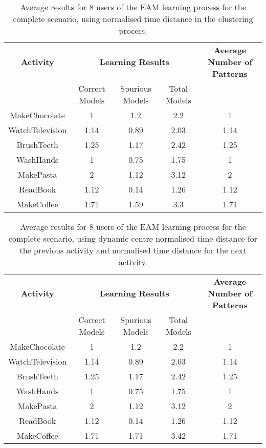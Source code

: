\begin{table}[htbp]\scriptsize
  \begin{center}
        \begin{tabular}{ccccc}
            \hline            
            \textbf{Activity} & \multicolumn{3}{c}{\textbf{Learning Results}} & \textbf{Average Number of Patterns} \\
             & Correct Models & Spurious Models & Total Models & \\
            \hline
            MakeChocolate   & 1    & 1.2   & 2.2  & 1 \\
	    WatchTelevision & 1.14 & 0.89  & 2.03 & 1.14 \\
	    BrushTeeth      & 1.25 & 1.17  & 2.42 & 1.25 \\
	    WashHands       & 1    & 0.75  & 1.75 & 1 \\
	    MakePasta       & 2    & 1.12  & 3.12 & 2 \\
	    ReadBook        & 1.12 & 0.14  & 1.26 & 1.12 \\
	    MakeCoffee      & 1.71 & 1.59  & 3.3 & 1.71 \\
            \hline
        \end{tabular}                
        \caption{Average results for 8 users of the EAM learning process for the complete scenario, using normalised time distance in the clustering process.}
        \label{tab-rp-comp-t1}
    \end{center}
\end{table}



\begin{table}[htbp]\scriptsize
  \begin{center}
        \begin{tabular}{ccccc}
            \hline            
            \textbf{Activity} & \multicolumn{3}{c}{\textbf{Learning Results}} & \textbf{Average Number of Patterns} \\
             & Correct Models & Spurious Models & Total Models & \\
            \hline
            MakeChocolate   & 1    & 1.2   & 2.2  & 1 \\
	    WatchTelevision & 1.14 & 0.89  & 2.03 & 1.14 \\
	    BrushTeeth      & 1.25 & 1.17  & 2.42 & 1.25 \\
	    WashHands       & 1    & 0.75  & 1.75 & 1 \\
	    MakePasta       & 2    & 1.12  & 3.12 & 2 \\
	    ReadBook        & 1.12 & 0.14  & 1.26 & 1.12 \\
	    MakeCoffee      & 1.71 & 1.71  & 3.42 & 1.71 \\
            \hline
        \end{tabular}                
        \caption{Average results for 8 users of the EAM learning process for the complete scenario, using dynamic centre normalised time distance for the previous activity and normalised time distance for the next activity.}
        \label{tab-rp-comp-t2}
    \end{center}
\end{table}

